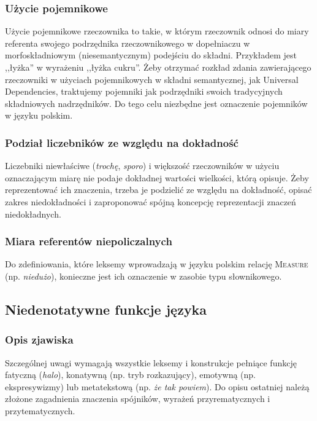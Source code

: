 \documentclass[a4paper, 12pt]{article}
\theoremstyle{remark}
\begin{document}
\subsubsection{Użycie pojemnikowe} %
\label{pojemniki}
Użycie pojemnikowe rzeczownika to takie, w którym rzeczownik odnosi do miary referenta swojego podrzędnika rzeczownikowego w dopełniaczu w morfoskładniowym (niesemantycznym) podejściu do składni. Przykładem jest ,,łyżka'' w wyrażeniu ,,łyżka cukru''.
Żeby otrzymać rozkład zdania zawierającego rzeczowniki w użyciach pojemnikowych w składni semantycznej, jak Universal Dependencies, traktujemy pojemniki jak podrzędniki swoich tradycyjnych składniowych nadrzędników. Do tego celu niezbędne jest oznaczenie pojemników w języku polskim.


\subsubsection{Podział liczebników ze względu na dokładność} %

Liczebniki niewłaściwe (\emph{trochę}, \emph{sporo}) i większość rzeczowników w użyciu oznaczającym miarę nie podaje dokładnej wartości wielkości, którą opisuje. Żeby reprezentować ich znaczenia, trzeba je podzielić ze względu na dokładność, opisać zakres niedokładności i zaproponować spójną koncepcję reprezentacji znaczeń niedokładnych.


\subsubsection{Miara referentów niepoliczalnych} %

Do zdefiniowania, które leksemy wprowadzają w języku polskim relację \textsc{Measure} (np. \emph{niedużo}), konieczne jest ich oznaczenie w zasobie typu słownikowego.



\subsection{Niedenotatywne funkcje języka} %
{
\renewcommand\thesubsection{}
\renewcommand\thesubsubsection{}
\setcounter{subsection}{-1}
\subsubsection{Opis zjawiska} %
\label{sub:opis_zjawiska2}
}
Szczególnej uwagi wymagają wszystkie leksemy i konstrukcje pełniące funkcję fatyczną (\emph{halo}), konatywną (np. tryb rozkazujący), emotywną (np. ekspresywizmy) lub metatekstową (np. \emph{że tak powiem}).
Do opisu ostatniej należą złożone zagadnienia znaczenia spójników, wyrażeń przyrematycznych i przytematycznych.
\end{document}
